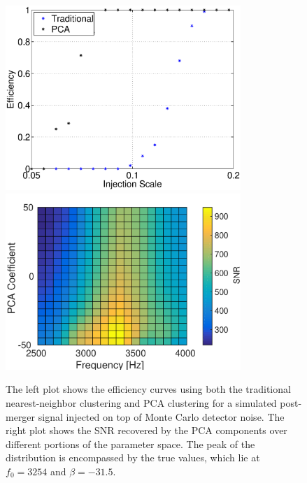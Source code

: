 \documentclass[prd,showpacs,superscriptaddress,twocolumn,
floatfix,preprintnumbers,altaffilletter]{revtex4}
\begin{document}
\begin{figure}[t]
 \includegraphics[width=3.5in]{X_seedless_eff.eps}
 \includegraphics[width=3.5in]{paramest_PMNS.pdf}
 \caption{
   The left plot shows the efficiency curves using both the traditional nearest-neighbor clustering and PCA clustering for a simulated post-merger signal injected on top of Monte Carlo detector noise.
   The right plot shows the SNR recovered by the PCA components over different portions of the parameter space. The peak of the distribution is encompassed by the true values, which lie at $f_0 = 3254$ and $\beta = -31.5$.
 }
 \label{fig:results}
\end{figure}
\end{document}
